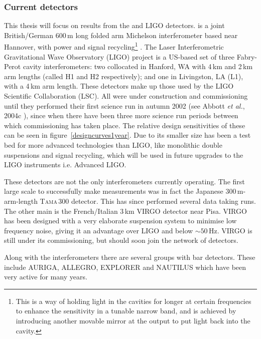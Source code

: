 \subsubsection{Current detectors}
This thesis will focus on results from the \geo and LIGO detectors. \geo is a joint British/German
600\,m long folded arm Michelson interferometer based near Hannover, with power and signal
recycling\footnote{This is a way of holding light in the cavities for longer at certain frequencies
to enhance the sensitivity in a tunable narrow band, and is achieved by introducing another movable
mirror at the output to put light back into the cavity.} \cite{Willke:2002}. The Laser
Interferometric Gravitational Wave Observatory (LIGO) project \cite{Abramovici:1992} is a US-based
set of three Fabry-Perot cavity interferometers: two collocated in Hanford, WA with 4\,km and 2\,km
arm lengths (called H1 and H2 respectively); and one in Livingston, LA (L1), with a 4\,km arm
length. These detectors make up those used by the LIGO Scientific Collaboration (LSC). All were
under construction and commissioning until they performed their first science run in autumn 2002
(see Abbott {\it et al.}, 2004c \cite{Abbott3:2004}), since when there have been three more science
run periods between which commissioning has taken place. The relative design sensitivities of these
can be seen in figure~\ref{designcurves1year}. Due to its smaller size \geo has been a test bed for
more advanced technologies than LIGO, like monolithic double suspensions and signal recycling, which
will be used in future upgrades to the LIGO instruments i.e. Advanced LIGO.

These detectors are not the only interferometers currently operating. The first large scale \ifo
to successfully make measurements was in fact the Japanese 300\,m-arm-length T\textsc{ama}\,300
detector. This has since performed several data taking runs. The other main \ifo is the
French/Italian 3\,km VIRGO detector near Pisa. VIRGO has been designed with a very elaborate
suspension system to minimise low frequency noise, giving it an advantage over LIGO and \geo below
$\sim 50$\,Hz. VIRGO is still under its commissioning, but should soon join the network of
detectors. 

Along with the interferometers there are several groups with bar detectors. These include AURIGA,
ALLEGRO, EXPLORER and NAUTILUS which have been very active for many years.

